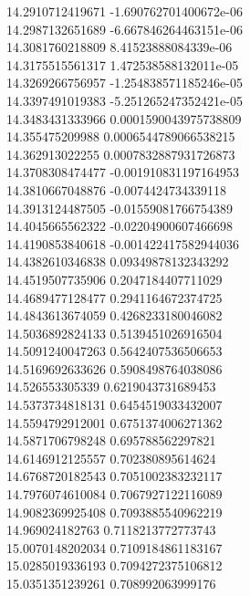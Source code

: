 {14.2910712419671 -1.690762701400672e-06 \\
14.2987132651689 -6.667846264463151e-06 \\
14.3081760218809 8.41523888084339e-06 \\
14.3175515561317 1.472538588132011e-05 \\
14.3269266756957 -1.254838571185246e-05 \\
14.3397491019383 -5.251265247352421e-05 \\
14.3483431333966 0.0001590043975738809 \\
14.355475209988 0.0006544789066538215 \\
14.362913022255 0.0007832887931726873 \\
14.3708308474477 -0.001910831197164953 \\
14.3810667048876 -0.0074424734339118 \\
14.3913124487505 -0.01559081766754389 \\
14.4045665562322 -0.02204900607466698 \\
14.4190853840618 -0.001422417582944036 \\
14.4382610346838 0.09349878132343292 \\
14.4519507735906 0.2047184407711029 \\
14.4689477128477 0.2941164672374725 \\
14.4843613674059 0.4268233180046082 \\
14.5036892824133 0.5139451026916504 \\
14.5091240047263 0.5642407536506653 \\
14.5169692633626 0.5908498764038086 \\
14.526553305339 0.6219043731689453 \\
14.5373734818131 0.6454519033432007 \\
14.5594792912001 0.6751374006271362 \\
14.5871706798248 0.695788562297821 \\
14.6146912125557 0.702380895614624 \\
14.6768720182543 0.7051002383232117 \\
14.7976074610084 0.7067927122116089 \\
14.9082369925408 0.7093885540962219 \\
14.969024182763 0.7118213772773743 \\
15.0070148202034 0.7109184861183167 \\
15.0285019336193 0.7094272375106812 \\
15.0351351239261 0.708992063999176 \\
}
